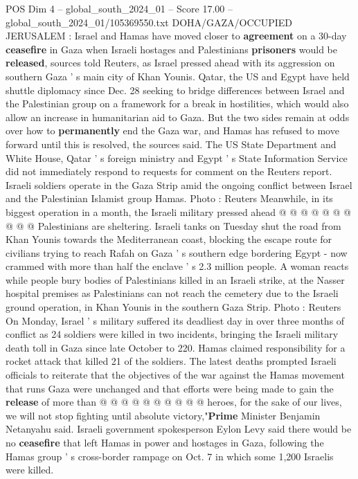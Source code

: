 \begin{textsample}{POS Dim 4 – global\_south\_2024\_01 – Score 17.00 – global\_south\_2024\_01/105369550.txt}  \label{ex:f4_pos_372}
DOHA/GAZA/OCCUPIED JERUSALEM : Israel and Hamas have moved closer to \textbf{agreement} on a 30-day \textbf{ceasefire} in Gaza when Israeli hostages and Palestinians \textbf{prisoners} would be \textbf{released}, sources told Reuters, as Israel pressed ahead with its aggression on southern Gaza ' s main city of Khan Younis.
Qatar, the US and Egypt have held shuttle diplomacy since Dec. 28 seeking to bridge differences between Israel and the Palestinian group on a framework for a break in hostilities, which would also allow an increase in humanitarian aid to Gaza.
But the two sides remain at odds over how to \textbf{permanently} end the Gaza war, and Hamas has refused to move forward until this is resolved, the sources said.
The US State Department and White House, Qatar ' s foreign ministry and Egypt ' s State Information Service did not immediately respond to requests for comment on the Reuters report.
Israeli soldiers operate in the Gaza Strip amid the ongoing conflict between Israel and the Palestinian Islamist group Hamas.
Photo : Reuters Meanwhile, in its biggest operation in a month, the Israeli military pressed ahead @ @ @ @ @ @ @ @ @ @ Palestinians are sheltering.
Israeli tanks on Tuesday shut the road from Khan Younis towards the Mediterranean coast, blocking the escape route for civilians trying to reach Rafah on Gaza ' s southern edge bordering Egypt - now crammed with more than half the enclave ' s 2.3 million people.
A woman reacts while people bury bodies of Palestinians killed in an Israeli strike, at the Nasser hospital premises as Palestinians can not reach the cemetery due to the Israeli ground operation, in Khan Younis in the southern Gaza Strip.
Photo : Reuters On Monday, Israel ' s military suffered its deadliest day in over three months of conflict as 24 soldiers were killed in two incidents, bringing the Israeli military death toll in Gaza since late October to 220.
Hamas claimed responsibility for a rocket attack that killed 21 of the soldiers.
The latest deaths prompted Israeli officials to reiterate that the objectives of the war against the Hamas movement that runs Gaza were unchanged and that efforts were being made to gain the \textbf{release} of more than @ @ @ @ @ @ @ @ @ @ heroes, for the sake of our lives, we will not stop fighting until absolute victory,"\textbf{Prime} Minister Benjamin Netanyahu said.
Israeli government spokesperson Eylon Levy said there would be no \textbf{ceasefire} that left Hamas in power and hostages in Gaza, following the Hamas group ' s cross-border rampage on Oct. 7 in which some 1,200 Israelis were killed.

\end{textsample}

